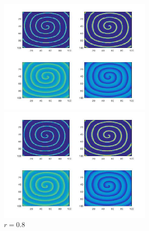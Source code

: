 \documentclass[
bachelor,
nofont, %
pdflinks,
]{xjtuthesis}
\begin{document}
\begin{figure}[!ht]
\begin{minipage}[!ht]{0.5\linewidth}
\centering
\includegraphics[width=3.0in]{p10r0_5_1.jpg}
\caption{$r=0.5$}
\end{minipage}%
\begin{minipage}[!ht]{0.5\linewidth}
\centering
\includegraphics[width=3.0in]{p10r0_8_1.jpg}
\caption{$r=0.8$}
\end{minipage}
\end{figure}
\end{document}
